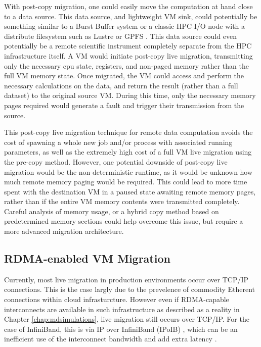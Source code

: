 With post-copy migration, one could easily move the computation at hand close to a data source. This data source, and lightweight VM sink, could potentially be something similar to a Burst Buffer system \cite{Lofstead2014,wright2015trinity} or a classic HPC I/O node with a distribute filesystem such as Lustre or GPFS \cite{schmuck2002gpfs}. This data source could even potentially be a remote scientific instrument completely separate from the HPC infrastructure itself.  A VM would initiate post-copy live migration, transmitting  only the necessary cpu state, registers, and non-paged memory rather than the full VM memory state. Once migrated, the VM could access and perform the necessary calculations on the data, and return the result (rather than a full dataset) to the original source VM. During this time, only the necessary memory pages required would generate a fault and trigger their transmission from the source.  

This post-copy live migration technique for remote data computation avoids the cost of spawning a whole new job and/or process with associated running parameters, as well as the extremely high cost of a full VM live migration using the pre-copy method. However, one potential downside of post-copy live migration would be the non-deterministic runtime, as it would be unknown how much remote memory paging would be required. This could lead to more time spent with the destination VM in a paused state awaiting remote memory pages, rather than if the entire VM memory contents were transmitted completely. Careful analysis of memory usage, or a hybrid copy method based on predetermined memory sections could help overcome this issue, but require a more advanced migration architecture. 



\subsection{RDMA-enabled VM Migration}

Currently, most live migration in production environments occur over TCP/IP connections. This is the case largly due to the prevelence of commodity Etherent connections within cloud infrasturcture. However even if RDMA-capable interconnects are available in such infrastructure as described as a reality in Chapter \ref{chap:mdsimulations}, live migration still occurs over TCP/IP. For the case of InfiniBand, this is via IP over InfiniBand (IPoIB) \cite{chu2006ipoib}, which can be an inefficient use of the interconnect bandwidth and add extra latency \cite{yu2008performance}. 

